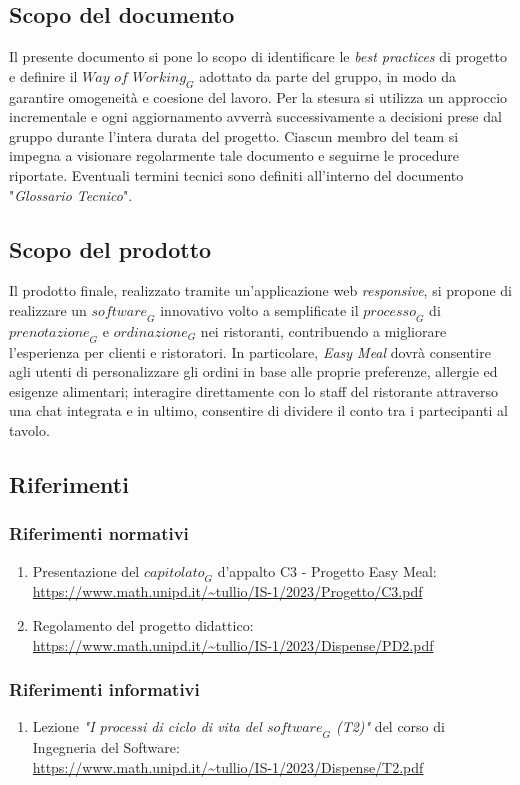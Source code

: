 \subsection{Scopo del documento}
Il presente documento si pone lo scopo di identificare le \emph{best practices} di progetto e definire il $\textit{Way of Working}_G$ adottato da parte del gruppo, in modo da garantire omogeneità e coesione del lavoro. Per la stesura si utilizza un approccio incrementale e ogni aggiornamento avverrà successivamente a decisioni prese dal gruppo durante l'intera durata del progetto. Ciascun membro del team si impegna a visionare regolarmente tale documento e seguirne le procedure riportate.
Eventuali termini tecnici sono definiti all'interno del documento "\emph{Glossario Tecnico}".
\subsection{Scopo del prodotto}
Il prodotto finale, realizzato tramite un'applicazione web \emph{responsive}, si propone di realizzare un $\textit{software}_G$ innovativo volto a semplificate il $\textit{processo}_G$ di $\textit{prenotazione}_G$ e $\textit{ordinazione}_G$ nei ristoranti, contribuendo a migliorare l'esperienza per clienti e ristoratori. In particolare, \textit{Easy Meal} dovrà consentire agli utenti di personalizzare gli ordini in base alle proprie preferenze, allergie ed esigenze alimentari; interagire direttamente con lo staff del ristorante attraverso una chat integrata e in ultimo, consentire di dividere il conto tra i partecipanti al tavolo.
\subsection{Riferimenti}
\subsubsection{Riferimenti normativi}
\begin{enumerate}
    \item Presentazione del $\textit{capitolato}_G$ d'appalto C3 - Progetto Easy Meal: \\ \url{https://www.math.unipd.it/~tullio/IS-1/2023/Progetto/C3.pdf}
    \item Regolamento del progetto didattico: \\ 
    \url{https://www.math.unipd.it/~tullio/IS-1/2023/Dispense/PD2.pdf}
\end{enumerate}
\subsubsection{Riferimenti informativi}
\begin{enumerate}
    \item Lezione \emph{"I processi di ciclo di vita del $\textit{software}_G$ (T2)"} del corso di Ingegneria del Software: \\
    \url{https://www.math.unipd.it/~tullio/IS-1/2023/Dispense/T2.pdf}
\end{enumerate}